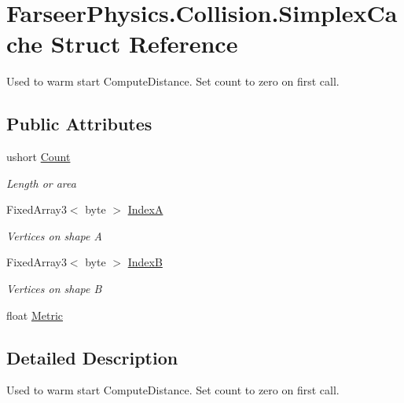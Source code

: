 \hypertarget{struct_farseer_physics_1_1_collision_1_1_simplex_cache}{\section{Farseer\+Physics.\+Collision.\+Simplex\+Cache Struct Reference}
\label{struct_farseer_physics_1_1_collision_1_1_simplex_cache}
}


Used to warm start Compute\+Distance. Set count to zero on first call.  


\subsection*{Public Attributes}
\begin{DoxyCompactItemize}
\item 
ushort \hyperlink{struct_farseer_physics_1_1_collision_1_1_simplex_cache_a9331fe0cd89359cb905e3e014d6e4f90}{Count}
\begin{DoxyCompactList}\small\item\em Length or area \end{DoxyCompactList}\item 
Fixed\+Array3$<$ byte $>$ \hyperlink{struct_farseer_physics_1_1_collision_1_1_simplex_cache_a7440f15a39586b449e3847c88d63dae5}{Index\+A}
\begin{DoxyCompactList}\small\item\em Vertices on shape A \end{DoxyCompactList}\item 
Fixed\+Array3$<$ byte $>$ \hyperlink{struct_farseer_physics_1_1_collision_1_1_simplex_cache_aa03eca90b3ee437635fecf1876181896}{Index\+B}
\begin{DoxyCompactList}\small\item\em Vertices on shape B \end{DoxyCompactList}\item 
float \hyperlink{struct_farseer_physics_1_1_collision_1_1_simplex_cache_a7848e47e9ee157cd5da79d85f64577ad}{Metric}
\end{DoxyCompactItemize}


\subsection{Detailed Description}
Used to warm start Compute\+Distance. Set count to zero on first call. 



